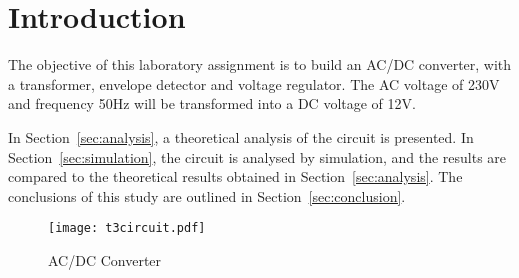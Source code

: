 \section{Introduction}
\label{sec:introduction}

The objective of this laboratory assignment is to build an AC/DC converter, with a transformer, envelope  detector and voltage regulator. The AC voltage of 230V and frequency 50Hz will be transformed into a DC voltage of 12V.

In Section~\ref{sec:analysis}, a theoretical analysis of the circuit is
presented. In Section~\ref{sec:simulation}, the circuit is analysed by
simulation, and the results are compared to the theoretical results obtained in
Section~\ref{sec:analysis}. The conclusions of this study are outlined in
Section~\ref{sec:conclusion}.

\begin{figure}[H] \centering
\texttt{[image: t3circuit.pdf]}
\caption{AC/DC Converter}
\label{fig:t3}
\end{figure}


